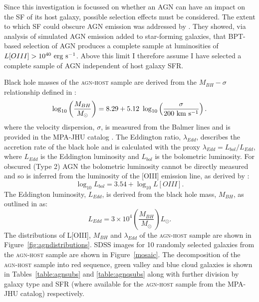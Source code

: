 Since this investigation is focussed on whether an AGN can have an impact on the SF of its host galaxy, possible selection effects must be considered. The extent to which SF could obscure AGN emission was addressed by \cite{schawinski10a}. They showed, via analysis of simulated AGN emission added to star-forming galaxies, that BPT-based selection of AGN produces a complete sample at luminosities of $L[OIII] > 10^{40}~\rm{erg~s}^{-1}$. Above this limit I therefore assume I have selected a complete sample of AGN independent of host galaxy SFR. 

Black hole masses of the \textsc{agn-host} sample are derived from the $M_{BH}-\sigma$ relationship defined in \citet{mcconnell11}:
\begin{equation}
\log_{10}\left(\frac{M_{BH}}{M_{\odot}}\right) = 8.29 + 5.12 ~\log_{10}\left(\frac{\sigma}{200 ~\rm{km} ~s^{-1}}\right). 
\end{equation}
where the velocity dispersion, $\sigma$, is measured from the Balmer lines and is provided in the MPA-JHU catalog \citep{kauffmann03, brinchmann04}. The Eddington ratio, $\lambda_{Edd}$, describes the accretion rate of the black hole and is calculated with the proxy $\lambda_{Edd} = L_{bol}/L_{Edd}$, where $L_{Edd}$ is the Eddington luminosity and $L_{bol}$ is the bolometric luminosity. For obscured (Type 2) AGN the bolometric luminosity cannot be directly measured and so is inferred from the luminosity of the [OIII] emission line, as derived by \citet{heckman04}:
\begin{equation}
\log_{10}L_{bol} = 3.54 + \log_{10}L[OIII]. 
\end{equation}
The Eddington luminosity, $L_{Edd}$, is derived from the black hole mass, $M_{BH}$, as outlined in \citet{binneymerrifield} as:
\begin{equation}
L_{Edd} = 3\times10^4 \left(\frac{M_{BH}}{M_{\odot}}\right) L_{\odot}.
\end{equation}
The distributions of L[OIII], $M_{BH}$ and $\lambda_{Edd}$ of the \textsc{agn-host} sample are shown in Figure~\ref{fig:agndistributions}. SDSS images for 10 randomly selected galaxies from the \textsc{agn-host} sample are shown in Figure~\ref{mosaic}. The decomposition of the \textsc{agn-host} sample into red sequence, green valley and blue cloud galaxies is shown in Tables~\ref{table:agnsubs} and \ref{table:agnqsubs} along with further division by galaxy type and SFR (where available for the \textsc{agn-host} sample from the MPA-JHU catalog) respectively. 


